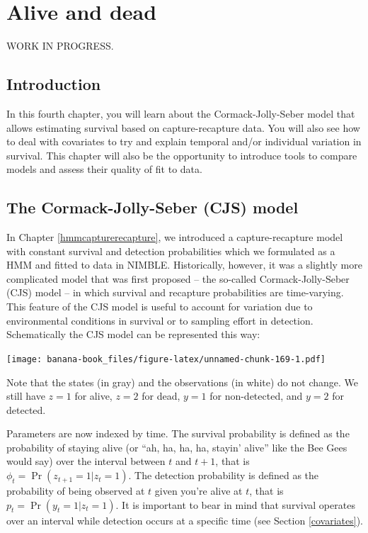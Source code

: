 \documentclass[
  12pt,
]{krantz}
\begin{document}
\hypertarget{survival}{%
\chapter{Alive and dead}\label{survival}}

WORK IN PROGRESS.

\hypertarget{introduction-5}{%
\section{Introduction}\label{introduction-5}}

In this fourth chapter, you will learn about the Cormack-Jolly-Seber model that allows estimating survival based on capture-recapture data. You will also see how to deal with covariates to try and explain temporal and/or individual variation in survival. This chapter will also be the opportunity to introduce tools to compare models and assess their quality of fit to data.

\hypertarget{the-cormack-jolly-seber-cjs-model}{%
\section{The Cormack-Jolly-Seber (CJS) model}\label{the-cormack-jolly-seber-cjs-model}}

In Chapter \ref{hmmcapturerecapture}, we introduced a capture-recapture model with constant survival and detection probabilities which we formulated as a HMM and fitted to data in NIMBLE. Historically, however, it was a slightly more complicated model that was first proposed -- the so-called Cormack-Jolly-Seber (CJS) model -- in which survival and recapture probabilities are time-varying. This feature of the CJS model is useful to account for variation due to environmental conditions in survival or to sampling effort in detection. Schematically the CJS model can be represented this way:

\texttt{[image: banana-book\_files/figure-latex/unnamed-chunk-169-1.pdf]}

Note that the states (in gray) and the observations (in white) do not change. We still have \(z = 1\) for alive, \(z = 2\) for dead, \(y = 1\) for non-detected, and \(y = 2\) for detected.

Parameters are now indexed by time. The survival probability is defined as the probability of staying alive (or ``ah, ha, ha, ha, stayin' alive'' like the Bee Gees would say) over the interval between \(t\) and \(t+1\), that is \(\phi_t = \Pr(z_{t+1} = 1 | z_t = 1)\). The detection probability is defined as the probability of being observed at \(t\) given you're alive at \(t\), that is \(p_t = \Pr(y_{t} = 1 | z_t = 1)\). It is important to bear in mind that survival operates over an interval while detection occurs at a specific time (see Section \ref{covariates}).
\end{document}
